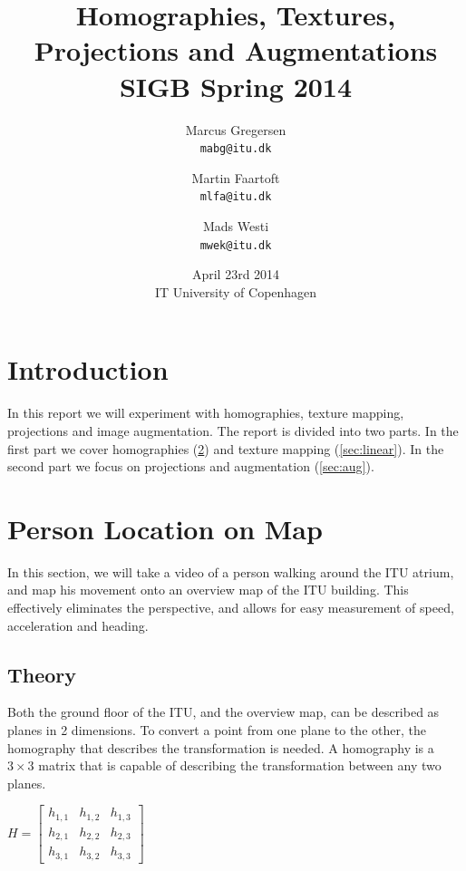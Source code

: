 \documentclass[a4paper,11pt]{article}
\begin{document}
\date{April 23rd 2014\\ IT University of Copenhagen}
\title{Homographies, Textures, Projections and Augmentations\\SIGB Spring 2014}

\author{Marcus Gregersen\\
\texttt{mabg@itu.dk}
\and Martin Faartoft\\
\texttt{mlfa@itu.dk}
\and Mads Westi\\
\texttt{mwek@itu.dk}}
\clearpage\maketitle
\thispagestyle{empty}
\setcounter{page}{1}
\newpage

\section{Introduction}
In this report we will experiment with homographies, texture mapping, projections and image augmentation. The report is divided into two parts. In the first part we cover homographies (\ref{sec:person}) and texture mapping (\ref{sec:linear}). In the second part we focus on projections and augmentation (\ref{sec:aug}).

\section{Person Location on Map}
\label{sec:person}
In this section, we will take a video of a person walking around the ITU atrium, and map his movement onto an overview map of the ITU building. This effectively eliminates the perspective, and allows for easy measurement of speed, acceleration and heading.

\subsection{Theory}
Both the ground floor of the ITU, and the overview map, can be described as planes in 2 dimensions. To convert a point from one plane to the other, the homography that describes the transformation is needed. A homography is a $3 \times 3$ matrix that is capable of describing the transformation between any two planes.
\begin{center}
$H =
\begin{bmatrix}
 h_{1,1} & h_{1,2} & h_{1,3} \\
 h_{2,1} & h_{2,2} & h_{2,3} \\
 h_{3,1} & h_{3,2} & h_{3,3}
\end{bmatrix}
$
\end{center}
\end{document}
